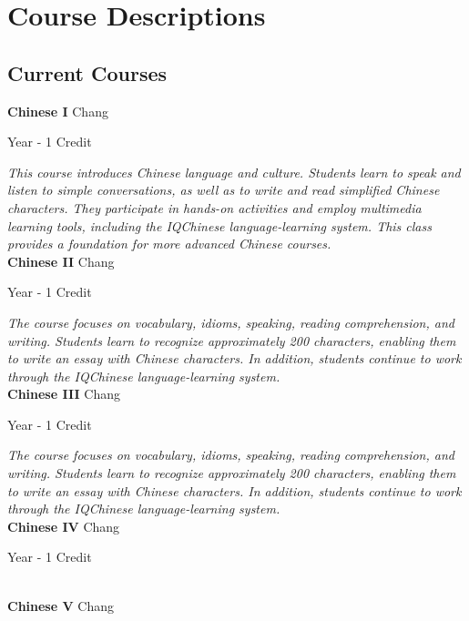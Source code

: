 \section{Course Descriptions}

\subsection{Current Courses}
\noindent\textbf{Chinese I} \hfill Chang

\noindent Year - 1 Credit

\vspace{1mm}\emph{This course introduces Chinese language and culture.  Students learn to speak and listen to simple conversations, as well as to write and read simplified Chinese characters.  They participate in hands-on activities and employ multimedia learning tools, including the IQChinese language-learning system.  This class provides a foundation for more advanced Chinese courses.}\\

\noindent\textbf{Chinese II} \hfill Chang

\noindent Year - 1 Credit

\vspace{1mm}\emph{The course focuses on vocabulary, idioms, speaking, reading comprehension, and writing.  Students learn to recognize approximately 200 characters, enabling them to write an essay with Chinese characters.  In addition, students continue to work through the IQChinese language-learning system.}\\

\noindent\textbf{Chinese III} \hfill Chang

\noindent Year - 1 Credit

\vspace{1mm}\emph{The course focuses on vocabulary, idioms, speaking, reading comprehension, and writing.  Students learn to recognize approximately 200 characters, enabling them to write an essay with Chinese characters.  In addition, students continue to work through the IQChinese language-learning system.}\\

\noindent\textbf{Chinese IV} \hfill Chang

\noindent Year - 1 Credit



\vspace{5mm}\\

\noindent\textbf{Chinese V} \hfill Chang

